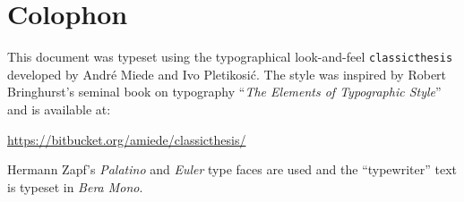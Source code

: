 \pagestyle{empty}

\hfill

\vfill

\section*{Colophon}
This document was typeset using the typographical look-and-feel \texttt{classicthesis} developed by Andr\'e Miede and Ivo Pletikosić.
The style was inspired by Robert Bringhurst's seminal book on typography ``\emph{The Elements of Typographic Style}'' and is available at:
\begin{center}
    \url{https://bitbucket.org/amiede/classicthesis/}
\end{center}

Hermann Zapf's \emph{Palatino} and \emph{Euler} type faces are used and the ``typewriter'' text is typeset in \emph{Bera Mono}.

